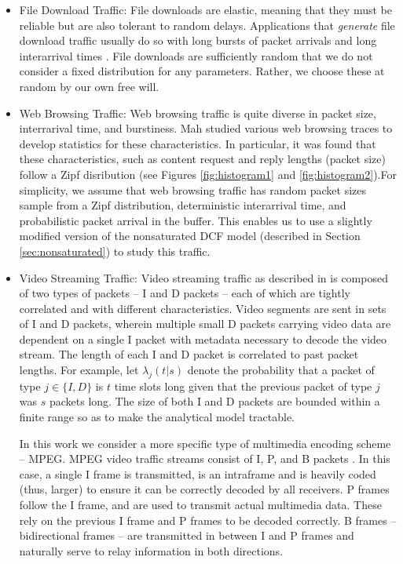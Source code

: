 \documentclass{llncs}
\begin{document}
\begin{itemize}
	\item File Download Traffic: File downloads are elastic, meaning that they must be reliable but are also tolerant to random delays. Applications that \emph{generate} file download traffic usually do so with long bursts of packet arrivals and long interarrival times \cite{kumar2004communication}. File downloads are sufficiently random that we do not consider a fixed distribution for any parameters. Rather, we choose these at random by our own free will. 

	\item Web Browsing Traffic: Web browsing traffic is quite diverse in packet size, interrarival time, and burstiness. Mah \cite{mah1997empirical} studied various web browsing traces to develop statistics for these characteristics. In particular, it was found that these characteristics, such as content request and reply lengths (packet size) follow a Zipf disribution (see Figures \ref{fig:histogram1} and \ref{fig:histogram2}).For simplicity, we assume that web browsing traffic has random packet sizes sample from a Zipf distribution, deterministic interarrival time, and probabilistic packet arrival in the buffer. This enables us to use a slightly modified version of the nonsaturated DCF model (described in Section \ref{sec:nonsaturated}) to study this traffic. 

	\item Video Streaming Traffic: Video streaming traffic as described in \cite{badia2010markov} is composed of two types of packets -- I and D packets -- each of which are tightly correlated and with different characteristics. Video segments are sent in sets of I and D packets, wherein multiple small D packets carrying video data are dependent on a single I packet with metadata necessary to decode the video stream. The length of each I and D packet is correlated to past packet lengths. For example, let $\lambda_j(t|s)$ denote the probability that a packet of type $j \in \{I ,D \}$ is $t$ time slots long given that the previous packet of type $j$ was $s$ packets long. The size of both I and D packets are bounded within a finite range so as to make the analytical model tractable. 

	In this work we consider a more specific type of multimedia encoding scheme -- MPEG. MPEG video traffic streams consist of I, P, and B packets \cite{sony-demo}. In this case, a single I frame is transmitted, is an intraframe and is heavily coded (thus, larger) to ensure it can be correctly decoded by all receivers. P frames follow the I frame, and are used to transmit actual multimedia data. These rely on the previous I frame and P frames to be decoded correctly. B frames -- bidirectional frames -- are transmitted in between I and P frames and naturally serve to relay information in both directions. 
\end{itemize}
\end{document}
